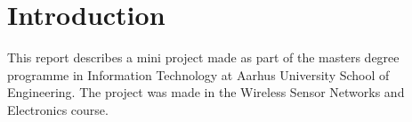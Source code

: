 \chapter{Introduction}
This report describes a mini project made as part of the masters degree programme in Information Technology at Aarhus University School of Engineering. The project was made in the Wireless Sensor Networks and Electronics course.

